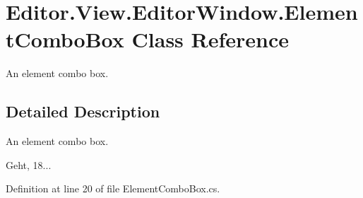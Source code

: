 \section{Editor.\-View.\-Editor\-Window.\-Element\-Combo\-Box Class Reference}
\label{class_editor_1_1_view_1_1_editor_window_1_1_element_combo_box}


An element combo box.  




\subsection{Detailed Description}
An element combo box. 

Geht, 18... 

Definition at line 20 of file Element\-Combo\-Box.\-cs.

